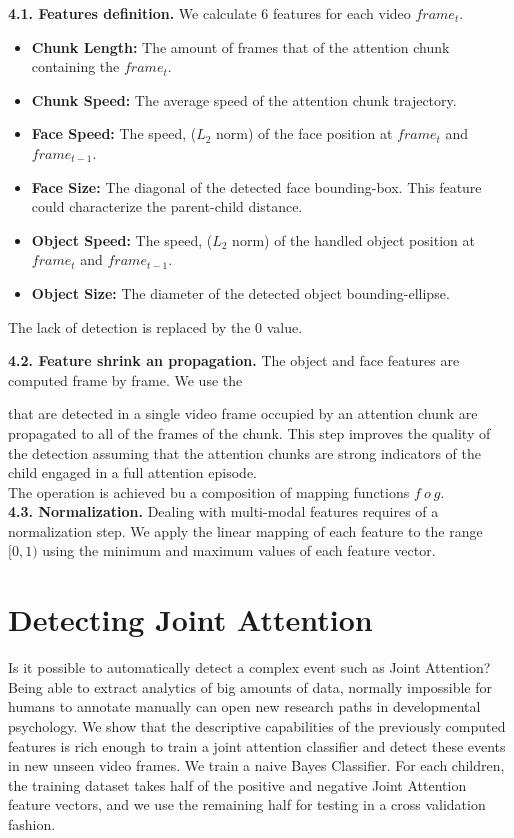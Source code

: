 \documentclass[10pt,letterpaper]{article}
\begin{document}
{\bf 4.1. Features definition.} We calculate 6 features for each video $frame_{t}$. 
\begin {itemize}
\item {\bf Chunk Length:} The amount of frames that of the attention chunk containing the $frame_{t}$.
\vspace {-0.2cm}
\item {\bf Chunk Speed:} The average speed of the attention chunk trajectory. 
\vspace {-0.2cm}
\item {\bf Face Speed:} The speed, ($L_{2}$ norm) of the face position at $frame_{t}$ and $frame_{t-1}$.    
\vspace {-0.2cm}
\item {\bf Face Size:} The diagonal of the detected face bounding-box. This feature could characterize the parent-child distance.   
\vspace {-0.2cm}
\item {\bf Object Speed:} The speed, ($L_{2}$ norm) of the handled object position at $frame_{t}$ and $frame_{t-1}$.    
\vspace {-0.2cm}
\item {\bf Object Size:} The diameter of the detected object bounding-ellipse.
\end{itemize}
The lack of detection is replaced by the 0 value. 

{\bf 4.2. Feature shrink an propagation.} The object and face features are computed frame by frame. We use the 

 that are detected in a single video frame occupied by an attention chunk are propagated to all of the frames of the chunk. This step improves the quality of the detection assuming that the attention chunks are strong indicators of the child engaged in a full attention episode.\\ The operation is achieved bu a composition of mapping functions $f ~o~ g$. \\


{\bf 4.3. Normalization.} Dealing with multi-modal features requires of a normalization step. We apply the linear mapping of each feature to the range $[0,1)$ using the minimum and maximum values of each feature vector.\\

\section{Detecting Joint Attention}
Is it possible to automatically detect a complex event such as Joint Attention? Being able to extract analytics of big amounts of data, normally impossible for humans to annotate manually can open new research paths in developmental psychology. We show that the descriptive capabilities of the previously computed features is rich enough to train a joint attention classifier and detect these events in new unseen video frames. We train a naive Bayes Classifier. For each children, the training dataset takes half of the positive and negative Joint Attention feature vectors, and we use the remaining half for testing in a cross validation fashion. 
 
\end{document}
